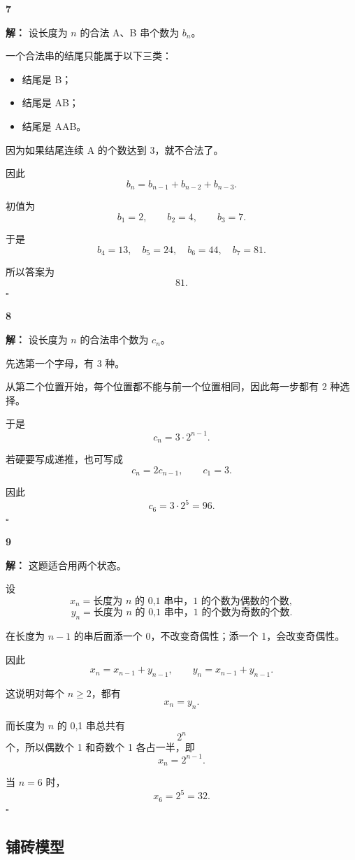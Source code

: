 \documentclass[11pt,a4paper,fontset=fandol]{ctexart}
\theoremstyle{formalexample}
\newenvironment{solution}{\par\noindent\textbf{解：}}{\hfill$\square$\par}
\begin{document}
\textbf{7}\begin{solution}
设长度为 $n$ 的合法 A、B 串个数为 $b_n$。

一个合法串的结尾只能属于以下三类：
\begin{itemize}
  \item 结尾是 B；
  \item 结尾是 AB；
  \item 结尾是 AAB。
\end{itemize}

因为如果结尾连续 A 的个数达到 3，就不合法了。

因此
\[
  b_n=b_{n-1}+b_{n-2}+b_{n-3}.
\]

初值为
\[
  b_1=2,
  \qquad
  b_2=4,
  \qquad
  b_3=7.
\]

于是
\[
  b_4=13,
  \quad
  b_5=24,
  \quad
  b_6=44,
  \quad
  b_7=81.
\]

所以答案为
\[
  81.
\]
\end{solution}

\textbf{8}\begin{solution}
设长度为 $n$ 的合法串个数为 $c_n$。

先选第一个字母，有 3 种。

从第二个位置开始，每个位置都不能与前一个位置相同，因此每一步都有 2 种选择。

于是
\[
  c_n=3\cdot 2^{n-1}.
\]

若硬要写成递推，也可写成
\[
  c_n=2c_{n-1},
  \qquad
  c_1=3.
\]

因此
\[
  c_6=3\cdot 2^5=96.
\]
\end{solution}

\textbf{9}\begin{solution}
这题适合用两个状态。

设
\[
  x_n=\text{长度为 $n$ 的 0,1 串中，1 的个数为偶数的个数},
\]
\[
  y_n=\text{长度为 $n$ 的 0,1 串中，1 的个数为奇数的个数}.
\]

在长度为 $n-1$ 的串后面添一个 0，不改变奇偶性；添一个 1，会改变奇偶性。

因此
\[
  x_n=x_{n-1}+y_{n-1},
\qquad
  y_n=x_{n-1}+y_{n-1}.
\]

这说明对每个 $n\ge 2$，都有
\[
  x_n=y_n.
\]

而长度为 $n$ 的 0,1 串总共有
\[
  2^n
\]
个，所以偶数个 1 和奇数个 1 各占一半，即
\[
  x_n=2^{n-1}.
\]

当 $n=6$ 时，
\[
  x_6=2^5=32.
\]
\end{solution}

\subsection*{铺砖模型}
\end{document}
